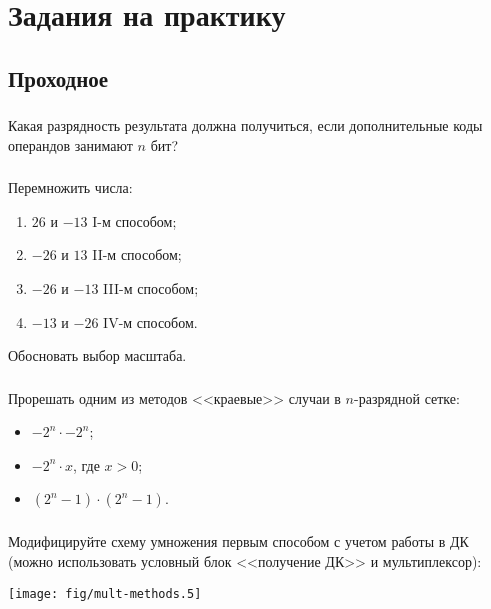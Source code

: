 \section{Задания на практику}


\subsection{Проходное}

\begin{frame}
    \frametitle{\TaskSimpleNumber}
    Какая разрядность результата должна получиться, если дополнительные коды операндов занимают $n$ бит?
\end{frame}

\begin{frame}
    \frametitle{\TaskSimpleNumber}

    Перемножить числа:

    \begin{enumerate}
        \item $26$ и $-13$ I-м способом; 
        \item $-26$ и $13$ II-м способом; 
        \item $-26$ и $-13$ III-м способом; 
        \item $-13$ и $-26$ IV-м способом.
    \end{enumerate}
    
    Обосновать выбор масштаба.
\end{frame}

\begin{frame}
    \frametitle{\TaskSimpleNumber}
    Прорешать одним из методов <<краевые>> случаи в $n$-разрядной сетке:
    \begin{itemize}
        \item $-2^n\cdot -2^n$;
        \item $-2^n\cdot x$, где $x>0$;
        \item $(2^n-1)\cdot(2^n-1)$.
    \end{itemize}
\end{frame}

\begin{frame}
    \frametitle{\TaskSimpleNumber}
    
    Модифицируйте схему умножения первым способом с учетом работы в ДК (можно использовать условный блок <<получение ДК>> и мультиплексор):
    \begin{center}
        \texttt{[image: fig/mult-methods.5]}
    \end{center}
\end{frame}

